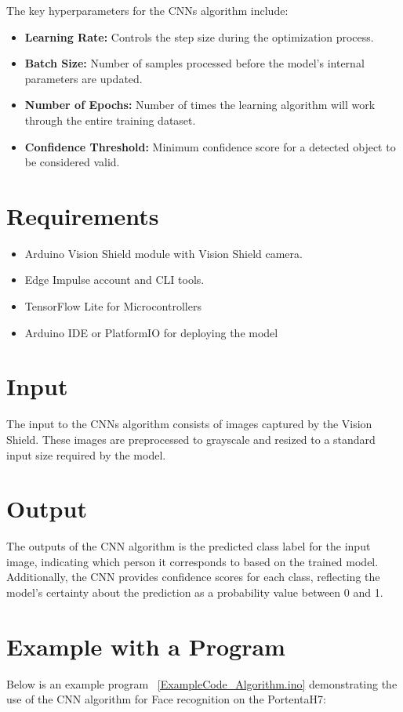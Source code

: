 The key hyperparameters for the CNNs algorithm include:

 \begin{itemize}
	\item \textbf{Learning Rate:} Controls the step size during the optimization process. \cite{brown_learning_rate_2023}
	\item \textbf{Batch Size:} Number of samples processed before the model’s internal parameters are updated. \cite{brown_learning_rate_2023}
	\item \textbf{Number of Epochs:} Number of times the learning algorithm will work through the entire training dataset. \cite{brown_learning_rate_2023}
	\item \textbf{Confidence Threshold:} Minimum confidence score for a detected object to be considered valid.
\end{itemize}

\section{Requirements}

    \begin{itemize}
	\item Arduino Vision Shield module with Vision Shield camera. \cite{arduino_portenta_camera_2023}
	\item Edge Impulse account and CLI tools. \cite{instructables_tinyml_edge_impulse_2023}
	\item TensorFlow Lite for Microcontrollers
	\item Arduino IDE or PlatformIO for deploying the model
\end{itemize}

\section{Input}

The input to the CNNs algorithm consists of images captured by the Vision Shield. These images are preprocessed to grayscale and resized to a standard input size required by the model.



\section{Output}
The outputs of the CNN algorithm is the predicted class label for the input image, indicating which person it corresponds to based on the trained model. Additionally, the CNN provides confidence scores for each class, reflecting the model's certainty about the prediction as a probability value between 0 and 1.

\section{Example with a Program}

Below is an example program  ~\ref{ExampleCode_Algorithm.ino} demonstrating the use of the CNN algorithm for Face recognition on the PortentaH7:


{
	\label{ExampleCode_Algorithm.ino}
}